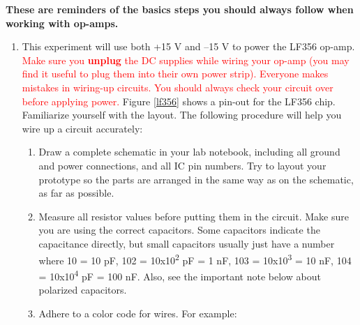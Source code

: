 \documentclass[10pt]{PhysLab1C} %
\begin{document}
\textbf{These are reminders of the basics steps you should always follow
when working with op-amps.}

\begin{enumerate}
\item
  This experiment will use both +15 V and --15 V to power the LF356
  op-amp. \textcolor{red}{Make sure you \textbf{unplug} the DC supplies while wiring
  your op-amp (you may find it useful to plug them into their own power
  strip). Everyone makes mistakes in wiring-up circuits. You should
  always check your circuit over before applying power.} Figure \ref{lf356} shows a
  pin-out for the LF356 chip. Familiarize yourself with the layout. The
  following procedure will help you wire up a circuit accurately:

  \begin{enumerate}
  \item
    Draw a complete schematic in your lab notebook, including all ground
    and power connections, and all IC pin numbers. Try to layout your
    prototype so the parts are arranged in the same way as on the
    schematic, as far as possible.
  \item
    Measure all resistor values before putting them in the circuit. Make
    sure you are using the correct capacitors. Some capacitors indicate
    the capacitance directly, but small capacitors usually just have a
    number where 10 = 10 pF, 102 = 10x10\textsuperscript{2} pF = 1 nF,
    103 = 10x10\textsuperscript{3} = 10 nF, 104 =
    10x10\textsuperscript{4} pF = 100 nF. Also, see the important note
    below about polarized capacitors.
  \item
    Adhere to a color code for wires. For example:


\end{enumerate}
\end{enumerate}
\end{document}
